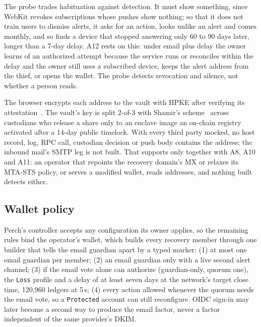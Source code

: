 The probe trades habituation against detection. It must show something,
since WebKit revokes subscriptions whose pushes show nothing; so that it
does not train users to dismiss alerts, it asks for an action, looks unlike
an alert and comes monthly, and so finds a device that stopped answering
only 60 to 90 days later, longer than a 7-day delay. A12 rests on this:
under email plus delay the owner learns of an authorized attempt because the
service runs or reconciles within the delay and the owner still uses a
subscribed device, keeps the alert address from the thief, or opens the
wallet. The probe detects revocation and silence, not whether a person
reads.

The browser encrypts each address to the vault with HPKE after verifying its
attestation~\cite{aws-nitro-attestation}. The vault's key is split 2-of-3
with Shamir's scheme~\cite{shamir} across custodians who release a share only
to an enclave image an on-chain registry activated after a 14-day public
timelock. With every third party mocked, no host
record, log, RPC call, custodian decision or push body contains the
address; the inbound mail's SMTP leg is
not built. That supports \PrivacyClaim{} only together with A8, A10 and
A11: an operator that repoints the recovery
domain's MX or relaxes its MTA-STS policy, or serves a modified wallet,
reads addresses, and nothing built detects either.

\subsection{Wallet policy}\label{sec:design-policy}
Perch's controller accepts any configuration its owner applies, so the
remaining rules bind the operator's wallet, which builds every recovery
member through one builder that tells the email guardian apart by a typed
marker: (1) at most one email guardian per member; (2) an email guardian
only with a live second alert channel; (3) if the email vote alone can
authorize (guardian-only, quorum one), the \texttt{Loss} profile and a delay
of at least seven days at the network's target close time, 120{,}960 ledgers
at 5\,s; (4) every action allowed whenever the quorum needs the email vote,
so a \texttt{Protected} account can still
reconfigure.
OIDC sign-in may later become a second way to produce the email factor,
never a factor independent of the same provider's DKIM.
